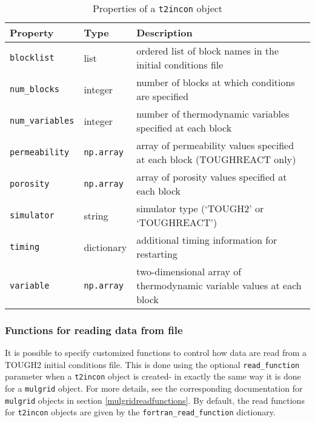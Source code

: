 \begin{table}
  \begin{center}
    \begin{tabular}{|l|l|p{75mm}|}
      \hline
      \textbf{Property} & \textbf{Type} & \textbf{Description}\\
      \hline
      \texttt{blocklist} & list & ordered list of block names in the initial conditions file\\
      \texttt{num\_blocks} & integer & number of blocks at which conditions are specified \\
      \texttt{num\_variables} & integer & number of thermodynamic variables specified at each block\\
      \texttt{permeability} & \texttt{np.array} & array of permeability values specified at each block (TOUGHREACT only)\\
      \texttt{porosity} & \texttt{np.array} & array of porosity values specified at each block\\
      \texttt{simulator} & string & simulator type (`TOUGH2' or `TOUGHREACT')\\
      \texttt{timing} & dictionary & additional timing information for restarting\\
      \texttt{variable} & \texttt{np.array} & two-dimensional array of thermodynamic variable values at each block\\
      \hline
    \end{tabular}
    \caption{Properties of a \texttt{t2incon} object}
    \label{tb:t2incon_properties}
  \end{center}
\end{table}

\subsubsection{Functions for reading data from file}

It is possible to specify customized functions to control how data are read from a TOUGH2 initial conditions file. This is done using the optional \texttt{read\_function} parameter when a \texttt{t2incon} object is created- in exactly the same way it is done for a \texttt{mulgrid} object. For more details, see the corresponding documentation for \texttt{mulgrid} objects in section \ref{mulgridreadfunctions}. By default, the read functions for \texttt{t2incon} objects are given by the \texttt{fortran\_read\_function} dictionary.

